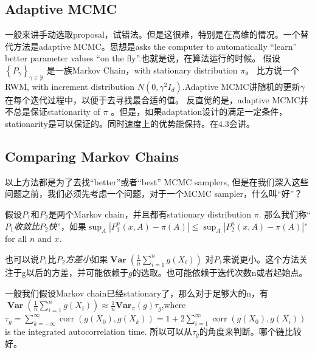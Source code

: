 \documentclass[
]{book}
\theoremstyle{definition}
\theoremstyle{definition}
\theoremstyle{definition}
\theoremstyle{remark}
\begin{document}
\hypertarget{adaptive-mcmc}{%
\subsection{Adaptive MCMC}\label{adaptive-mcmc}}

一般来讲手动选取proposal，试错法。但是这很难，特别是在高维的情况。一个替代方法是adaptive MCMC。思想是asks the computer to automatically ``learn'' better parameter values ``on the fly''.也就是说，在算法运行的时候。
假设\(\left\{P_{\gamma}\right\}_{\gamma \in \mathcal{Y}}\) 是一族Markov Chain，with stationary distribution \(\pi\)。 比方说一个RWM, with increment distribution \(N\left(0, \gamma^{2} I_{d}\right)\).Adaptive MCMC讲随机的更新\(\gamma\)在每个迭代过程中，以便于去寻找最合适的值。
反直觉的是，adaptive MCMC并不总是保证stationarity of \(\pi\) 。但是，如果adaptation设计的满足一定条件，stationarity是可以保证的。同时速度上的优势能保持。在4.3会讲。

\hypertarget{comparing-markov-chains}{%
\subsection{Comparing Markov Chains}\label{comparing-markov-chains}}

以上方法都是为了去找``better''或者``best'' MCMC samplers, 但是在我们深入这些问题之前，我们必须先考虑一个问题，对于一个MCMC sampler，什么叫``好''？

假设\(P_1\)和\(P_2\)是两个Markov chain，并且都有stationary distribution \(\pi\). 那么我们称``\emph{\(P_1\)收敛比\(P_2\)快}''，如果\(\sup _{A}\left|P_{1}^{n}(x, A)-\pi(A)\right| \leq \sup _{A}\left|P_{2}^{n}(x, A)-\pi(A)\right|\)" for all \(n\) and \(x\).

也可以说\(P_1\)比\(P_2\)\emph{方差小}如果\(\mathbf{\operatorname { V a r }}\left(\frac{1}{n} \sum_{i=1}^{n} g\left(X_{i}\right)\right)\) 对\(P_1\)来说更小。这个方法关注于g以后的方差，并可能依赖于\(g\)的选取。也可能依赖于迭代次数n或者起始点。

一般我们假设Markov chain已经stationary了，那么对于足够大的n，有\(\mathbf{\operatorname { Var }}\left(\frac{1}{n} \sum_{i=1}^{n} g\left(X_{i}\right)\right) \approx \frac{1}{n} \mathbf{V} \mathbf{a} \mathbf{r}_{\pi}(g) \tau_{g}\),where \(\tau_{g}=\sum_{k=-\infty}^{\infty} \operatorname{corr}\left(g\left(X_{0}\right), g\left(X_{k}\right)\right)=1+2 \sum_{i=1}^{\infty} \operatorname{corr}\left(g\left(X_{0}\right), g\left(X_{i}\right)\right)\) is the integrated autocorrelation time. 所以可以从\(\tau_g\)的角度来判断。哪个链比较好。
\end{document}
